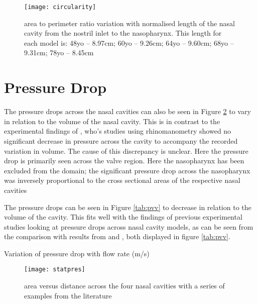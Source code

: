 \begin{figure}
\centering
\texttt{[image: circularity]}
\caption{area to perimeter ratio variation with normalised length of the nasal cavity from the nostril inlet to the nasopharynx. This length for each model is: 48yo – 8.97cm; 60yo – 9.26cm; 64yo – 9.60cm; 68yo – 9.31cm; 78yo – 8.45cm}
\label{fig:Circ}
\end{figure}

\section{Pressure Drop}

The pressure drops across the nasal cavities can also be seen in Figure \ref{fig:stpr} to vary in relation to the volume of the nasal cavity. This is in contrast to the experimental findings of \cite{Lindemann2008, Edelstein1996, WhanKim2007}, who’s studies using rhinomanometry showed no significant decrease in pressure across the cavity to accompany the recorded variation in volume. The cause of this discrepancy is unclear. Here the pressure drop is primarily seen across the valve region. Here the nasopharynx has been excluded from the domain; the significant pressure drop across the nasopharynx was inversely proportional to the cross sectional areas of the respective nasal cavities

The pressure drops can be seen in Figure \ref{tab:pvv} to decrease in relation to the volume of the cavity. This fits well with the findings of previous experimental studies looking at pressure drops across nasal cavity models, as can be seen from the comparison with results from \cite{Garcia2007} and \cite{Kelly2004}, both displayed in figure \ref{tab:pvv}.

  \begin{table} 
    \centering

  \caption{Variation of pressure drop with flow rate (m/s)}
  \label{tab:pvv}
\end{table}

\begin{figure} 
  \texttt{[image: statpres]}
  \caption{area versus distance across the four nasal cavities with a series of examples from the literature}
  \label{fig:stpr}
\end{figure}

